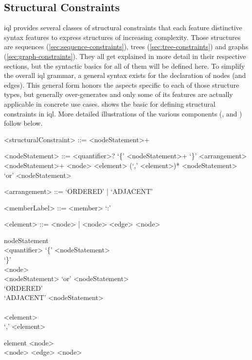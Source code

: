 \documentclass[11pt,a4paper]{report}
\begin{document}
\subsection{Structural Constraints}
\label{sec:structural-constraints}

\ac{iql} provides several classes of structural constraints that each feature distinctive syntax features to express structures of increasing complexity.
Those structures are sequences (\ref{sec:sequence-constraints}), trees (\ref{sec:tree-constraints}) and graphs (\ref{sec:graph-constraints}).
They all get explained in more detail in their respective sections, but the syntactic basics for all of them will be defined here.
To simplify the overall \ac{iql} grammar, a general syntax exists for the declaration of nodes (and edges).
This general form honors the aspects specific to each of those structure types, but generally over-generates and only some of its features are actually applicable in concrete use cases.
 shows the basic for defining structural constraints in \ac{iql}.
More detailed illustrations of the various components (,  and ) follow below.

\begin{gram}
	\label{gram:structural-constraint}
	\begin{grammar}		
		<structuralConstraint> ::= <nodeStatement>+
			
		<nodeStatement> ::= <quantifier>? `\{' <nodeStatement>+ `\}'
		\alt <arrangement> <nodeStatement>+
		\alt <element> (`,' <element>)*
		\alt <nodeStatement> `or' <nodeStatement>
		
		<arrangement> ::= `ORDERED' | `ADJACENT'
		
		<memberLabel> ::= <member> `:'
		
		<element> ::= <node> | <node> <edge> <node>
	\end{grammar}
	\diagsep
	\begin{rrdiag*}{nodeStatement}
		\sst
			\sst \\ <quantifier> \est `\{' \srp <nodeStatement> \\ \erp `\}' \\
			<node> \\
			<nodeStatement> `or' <nodeStatement> \\
			\sst `ORDERED' \\ `ADJACENT' \est \srp <nodeStatement> \\ \erp \\
			<element> \srp \\ `,' <element> \erp
		\est
	\end{rrdiag*}

	\begin{rrdiag*}{element}
		 \\ <node> <edge> <node> \est
	\end{rrdiag*}
\end{gram}
\end{document}
